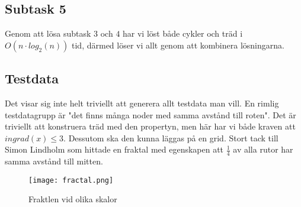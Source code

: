 \documentclass{article}
\begin{document}
\subsection*{Subtask 5}
Genom att lösa subtask $3$ och $4$ har vi löst både cykler och träd i $O(n\cdot log_2(n))$ tid, därmed löser vi allt genom att kombinera lösningarna. 

\subsection*{Testdata}
Det visar sig inte helt triviellt att generera allt testdata man vill. En rimlig testdatagrupp är "det finns många noder med samma avstånd till roten". Det är triviellt att konstruera träd med den propertyn, men här har vi både kraven att $ingrad(x) \leq 3$. Dessutom ska den kunna läggas på en grid. Stort tack till Simon Lindholm som hittade en fraktal med egenskapen att $\frac{1}{4}$ av alla rutor har samma avstånd till mitten. 
\begin{figure}[H]
\texttt{[image: fractal.png]}
  \caption{Fraktlen vid olika skalor}
  \label{fig:hoppers_t0}
\end{figure}
\end{document}

